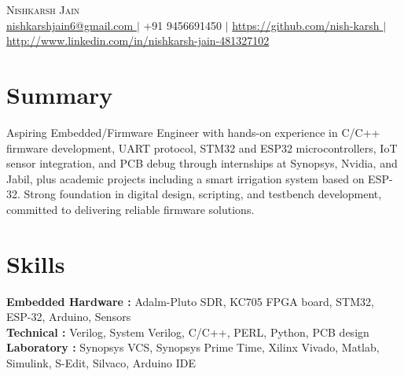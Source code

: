 \documentclass[letterpaper,11pt]{article}
\begin{document}
\begin{center}
    {\Huge \scshape Nishkarsh Jain} \\ \vspace{4pt}
    \small
\href{mailto:nishkarshjain6@gmail.com}{ nishkarshjain6@gmail.com } $|$ +91 9456691450 $|$ \href{ https://github.com/nish-karsh }{ https://github.com/nish-karsh } $|$ \href{ http://www.linkedin.com/in/nishkarsh-jain-481327102 }{ http://www.linkedin.com/in/nishkarsh-jain-481327102 }\end{center}

\section{Summary}
\small{ Aspiring Embedded/Firmware Engineer with hands-on experience in C/C++ firmware development, UART protocol, STM32 and ESP32 microcontrollers, IoT sensor integration, and PCB debug through internships at Synopsys, Nvidia, and Jabil, plus academic projects including a smart irrigation system based on ESP-32. Strong foundation in digital design, scripting, and testbench development, committed to delivering reliable firmware solutions. }

\section{Skills}
\begin{itemize}[leftmargin=0.15in, label={}]
  \small{\item{
    \textbf{ Embedded Hardware :} Adalm-Pluto SDR, KC705 FPGA board, STM32, ESP-32, Arduino, Sensors \\
    \textbf{ Technical :} Verilog, System Verilog, C/C++, PERL, Python, PCB design \\
    \textbf{ Laboratory :} Synopsys VCS, Synopsys Prime Time, Xilinx Vivado, Matlab, Simulink, S-Edit, Silvaco, Arduino IDE \\
  }}
\end{itemize}
\end{document}
